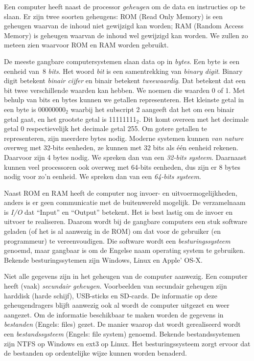 Een computer heeft naast de processor \textsl{geheugen} om de data en instructies op te slaan. Er zijn twee soorten geheugens: ROM (Read Only Memory) is een geheugen waarvan de inhoud niet gewijzigd kan worden; RAM (Random Access Memory) is geheugen waarvan de inhoud wel gewijzigd kan worden. We zullen zo meteen zien waarvoor ROM en RAM worden gebruikt.

\begin{infobox}
De meeste gangbare computersystemen slaan data op in \textsl{bytes}. Een byte is een eenheid van~8 \textsl{bits}. Het woord \textsl{bit} is een samentrekking van \textsl{binary digit}. Binary digit betekent \textsl{binair cijfer} en binair betekent \textsl{tweewaardig}. Dat betekent dat een bit twee verschillende waarden kan hebben. We noemen die waarden 0 of 1. Met behulp van bits en bytes kunnen we getallen representeren. Het kleinste getal in een byte is 00000000$_2$ waarbij het subscript 2 aangeeft dat het om een binair getal gaat, en het grootste getal is 11111111$_2$. Dit komt overeen met het decimale getal 0 respectievelijk het decimale getal 255. Om gotere getallen te representeren, zijn meerdere bytes nodig. Moderne systemen kunnen \textsl{van nature} overweg met 32-bits eenheden, ze kunnen met 32 bits als één eenheid rekenen. Daarvoor zijn 4 bytes nodig. We spreken dan van een \textsl{32-bits systeem}. Daarnaast kunnen veel processoren ook overweg met 64-bits eenheden, dus zijn er 8 bytes nodig voor zo'n eenheid. We spreken dan van een \textsl{64-bits systeem}.
\end{infobox}

Naast ROM en RAM heeft de computer nog invoer- en uitvoermogelijkheden, anders is er geen communicatie met de buitenwereld mogelijk. De verzamelnaam is \textsl{I/O} dat ``Input'' en ``Output'' betekent. Het is best lastig om de invoer en uitvoer te realiseren. Daarom wordt bij de gangbare computers een stuk software geladen (of het is al aanwezig in de ROM) om dat voor de gebruiker (en programmeur) te vereenvoudigen. Die software wordt een \textsl{besturingssysteem} genoemd, maar gangbaar is om de Engelse naam operating system te gebruiken. Bekende besturingssytemen zijn Windows, Linux en Apple' OS-X.

Niet alle gegevens zijn in het geheugen van de computer aanwezig. Een computer heeft (vaak) \textsl{secundair geheugen}. Voorbeelden van secundair geheugen zijn harddisk (harde schijf), USB-sticks en SD-cards. De informatie op deze geheugendragers blijft aanwezig ook al wordt de computer uitgezet en weer aangezet. Om de informatie beschikbaar te maken worden de gegevens in \textsl{bestanden} (Engels: files) gezet. De manier waarop dat wordt gerealiseerd wordt een \textsl{bestandssysteem} (Engels: file system) genoemd. Bekende bestandssystemen zijn NTFS op Windows en ext3 op Linux. Het besturingssysteem zorgt ervoor dat de bestanden op ordentelijke wijze kunnen worden benaderd.

